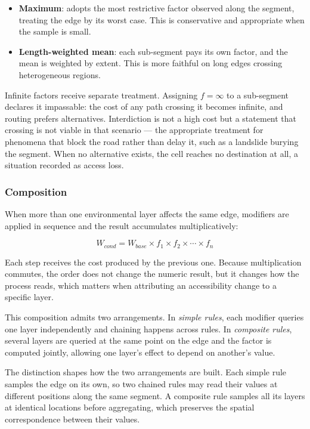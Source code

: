 \begin{itemize}
  \item \textbf{Maximum}: adopts the most restrictive factor observed along the segment, treating the edge by its worst case. This is conservative and appropriate when the sample is small.
  \item \textbf{Length-weighted mean}: each sub-segment pays its own factor, and the mean is weighted by extent. This is more faithful on long edges crossing heterogeneous regions.
\end{itemize}

Infinite factors receive separate treatment. Assigning $f = \infty$ to a sub-segment declares it impassable: the cost of any path crossing it becomes infinite, and routing prefers alternatives. Interdiction is not a high cost but a statement that crossing is not viable in that scenario — the appropriate treatment for phenomena that block the road rather than delay it, such as a landslide burying the segment. When no alternative exists, the cell reaches no destination at all, a situation recorded as access loss.

\subsubsection{Composition}

When more than one environmental layer affects the same edge, modifiers are applied in sequence and the result accumulates multiplicatively:

\begin{equation}
  W_{cond} = W_{base} \times f_1 \times f_2 \times \cdots \times f_n
\end{equation}

Each step receives the cost produced by the previous one. Because multiplication commutes, the order does not change the numeric result, but it changes how the process reads, which matters when attributing an accessibility change to a specific layer.

This composition admits two arrangements. In \emph{simple rules}, each modifier queries one layer independently and chaining happens across rules. In \emph{composite rules}, several layers are queried at the same point on the edge and the factor is computed jointly, allowing one layer's effect to depend on another's value.

The distinction shapes how the two arrangements are built. Each simple rule samples the edge on its own, so two chained rules may read their values at different positions along the same segment. A composite rule samples all its layers at identical locations before aggregating, which preserves the spatial correspondence between their values.

